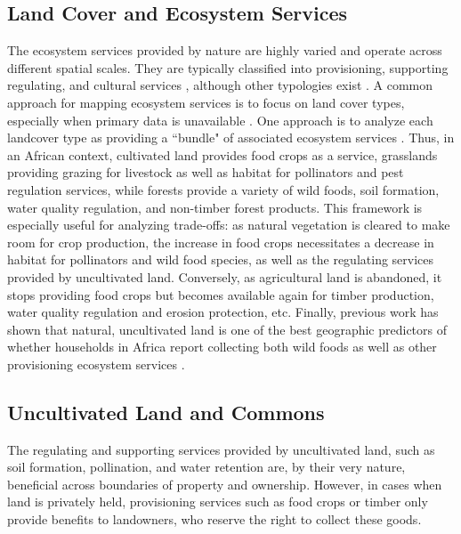 \documentclass{article}
\begin{document}
\subsection{Land Cover and Ecosystem Services}
The ecosystem services provided by nature are highly varied and operate across different spatial scales.  They are typically classified into provisioning, supporting regulating, and cultural services \cite{Martinez-Harms2012}, although other typologies exist \cite{Fisher2008}.  A common approach for mapping ecosystem services is to focus on land cover types, especially when primary data is unavailable \cite{Martinez-Harms2012}.  One approach is to analyze each landcover type as providing a ``bundle" of associated ecosystem services \cite{Raudsepp-Hearne2010}.  Thus, in an African context, cultivated land provides food crops as a service, grasslands providing grazing for livestock as well as habitat for pollinators and pest regulation services, while forests provide a variety of wild foods, soil formation, water quality regulation, and non-timber forest products.  This framework is especially useful for analyzing trade-offs: as natural vegetation is cleared to make room for crop production, the increase in food crops necessitates a decrease in habitat for pollinators and wild food species, as well as the regulating services provided by uncultivated land.  Conversely, as agricultural land is abandoned, it stops providing food crops but becomes available again for timber production, water quality regulation and erosion protection, etc.  Finally, previous work has shown that natural, uncultivated land is one of the best geographic predictors of whether households in Africa report collecting both wild foods as well as other provisioning ecosystem services \cite{Cooper2018a}.

\subsection{Uncultivated Land and Commons}
The regulating and supporting services provided by uncultivated land, such as soil formation, pollination, and water retention are, by their very nature, beneficial across boundaries of property and ownership.  However, in cases when land is privately held, provisioning services such as food crops or timber only provide benefits to landowners, who reserve the right to collect these goods.  
\end{document}
